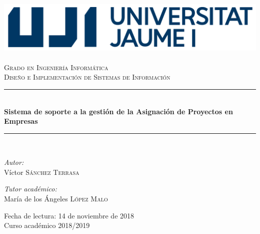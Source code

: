 \documentclass[pdftex,11pt,a4paper]{book}
\newcommand{\HRule}{\rule{\linewidth}{0.5mm}}
\begin{document}
\begin{titlepage}
\begin{center}

\includegraphics{img/marca-uji-2955.png}~\\[3.0cm]

\textsc{\LARGE Grado en Ingeniería Informática}\\[1.5cm]

\textsc{\LARGE Diseño e Implementación de Sistemas de Información}\\[1.5cm]

\HRule \\[0.4cm]
{ \huge \bfseries Sistema de soporte a la gestión de la Asignación de Proyectos en Empresas \\[0.4cm] }

\HRule \\[1.5cm]

\begin{minipage}{0.4\textwidth}
\begin{flushleft} \large
\emph{Autor:}\\
Víctor \textsc{Sánchez Terrasa}
\end{flushleft}
\end{minipage}
\begin{minipage}{0.4\textwidth}
\begin{flushright} \large
\emph{Tutor académico:} \\
María de los Ángeles \textsc{López Malo}
\end{flushright}
\end{minipage}

\vfill

{\large Fecha de lectura: 14 de noviembre de 2018\\
Curso académico 2018/2019}

\end{center}
\end{titlepage}
\setlength{\parskip}{\baselineskip}
\end{document}
